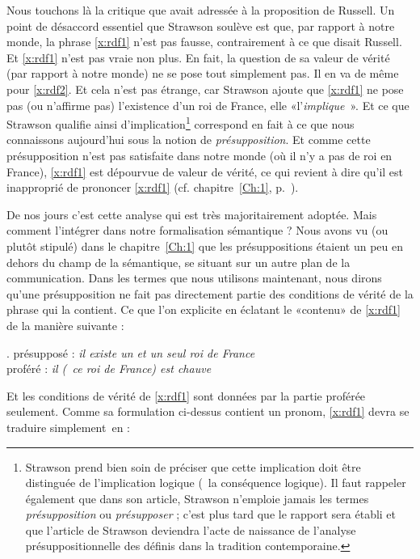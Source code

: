 Nous touchons là la critique que \citet{Strawson:50fr} avait adressée à 
la proposition de Russell.  Un point de désaccord essentiel que Strawson
soulève est que, par rapport à notre monde, la phrase \ref{x:rdf1}
n'est pas fausse, contrairement à ce que disait Russell.  Et
\ref{x:rdf1} n'est pas vraie non plus. En fait, la question de sa valeur de vérité (par rapport à notre monde) ne se pose tout simplement pas.
Il en va de même pour \ref{x:rdf2}. Et
cela n'est pas étrange, car Strawson 
ajoute que \ref{x:rdf1} ne pose pas (ou n'affirme pas) l'existence
d'un roi de France, elle «l'\emph{implique}~». 
Et ce que Strawson qualifie ainsi d'implication\footnote{Strawson prend bien soin de préciser que cette implication doit être distinguée de l'implication logique (\ie\ la conséquence logique). Il faut rappeler également que dans son article, Strawson n'emploie jamais les termes \emph{présupposition} ou \emph{présupposer} ; c'est plus tard que le rapport sera établi et que l'article de Strawson deviendra l'acte de naissance de l'analyse présuppositionnelle des {\GN} définis dans la tradition contemporaine.}
correspond en fait à ce que nous connaissons aujourd'hui sous la notion de \emph{présupposition}.
Et comme cette
présupposition n'est pas satisfaite dans notre monde (où il n'y a pas
de roi en France), \ref{x:rdf1}  est dépourvue de valeur de vérité,
ce qui revient à dire qu'il est inapproprié de prononcer
\ref{x:rdf1} (cf.  chapitre~\ref{Ch:1},
p.~\pageref{s:presuppositions}).   

De nos jours c'est cette analyse qui est très majoritairement adoptée.
Mais comment l'intégrer dans notre formalisation sémantique ?  Nous
avons vu (ou plutôt stipulé) dans le chapitre~\ref{Ch:1} que les
présuppositions étaient un peu en dehors du champ de la sémantique, se
situant sur un autre plan de la communication.  Dans les termes que
nous utilisons maintenant, nous dirons qu'une présupposition ne fait
pas directement partie des conditions de vérité de la phrase qui la
contient.  Ce que l'on explicite en éclatant le «contenu» de \ref{x:rdf1}
de la manière suivante :

\ex. 
{présupposé} : \emph{il existe un et un seul roi de France}\\
{proféré} : \emph{il (\ie\ ce roi de France) est chauve}


Et les conditions de vérité de \ref{x:rdf1} sont données par
la partie proférée seulement.  Comme sa formulation ci-dessus contient un
pronom, \ref{x:rdf1} devra se traduire simplement~en :

